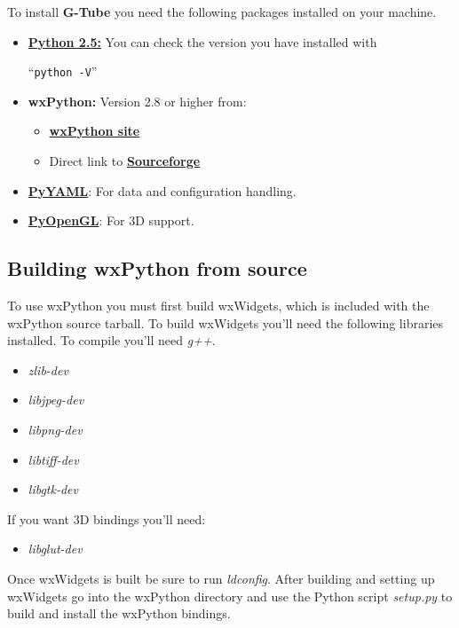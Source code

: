 \documentclass[12pt]{article}
\begin{document}
To install {\bf G-Tube} you need the following packages installed on your machine.

\begin{itemize}
   \item {\href{http://python.org/download/}{\bf Python 2.5:}} You can check the version you have installed with
   
   ``{\tt python -V}''
   
   \item {\bf wxPython:} Version 2.8 or higher from:   
   \begin{itemize}
      \item \href{http://www.wxpython.org/download.php}{\bf wxPython site}
      \item Direct link to \href{https://sourceforge.net/projects/wxpython/files/}{\bf Sourceforge}
   \end{itemize}
   \item \href{http://pyyaml.org/ }{\bf PyYAML}: For data and configuration handling.
	\item \href{http://pyopengl.sourceforge.net/}{\bf PyOpenGL}: For 3D support.
\end{itemize}

\subsection*{Building wxPython from source}

To use wxPython you must first build wxWidgets, which is included with the wxPython source tarball. To build wxWidgets you'll need the following libraries installed. To compile you'll need {\it g++}.

\begin{itemize}
   \item {\it zlib-dev}
   \item {\it libjpeg-dev}
   \item {\it libpng-dev}
   \item {\it libtiff-dev}
   \item {\it libgtk-dev}
\end{itemize}

    If you want 3D bindings you'll need: 

\begin{itemize}
   \item {\it libglut-dev}
\end{itemize}

Once wxWidgets is built be sure to run {\it ldconfig}. After building and setting up wxWidgets go into the wxPython directory and use the Python script {\it setup.py} to build and install the wxPython bindings.
\end{document}
